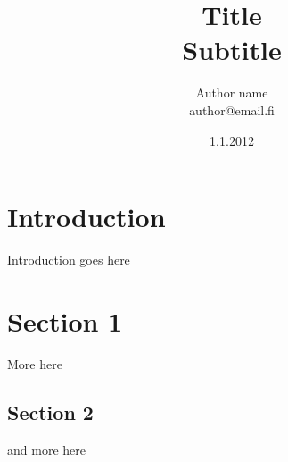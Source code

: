 \documentclass[a4paper]{article}
\begin{document}
\title{\huge Title \\ \large Subtitle}
\date{1.1.2012}
\author{Author name \\ author@email.fi}
\maketitle

\large

\section{Introduction}

Introduction goes here

\section{Section 1}

More here

\subsection{Section 2}

and more here




\end{document}
